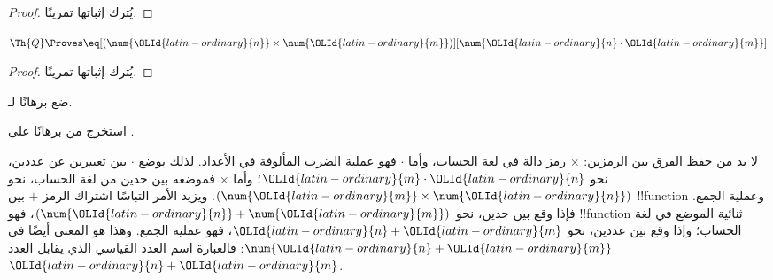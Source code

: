 \documentclass[../../../include/open-logic-section]{subfiles}
\begin{document}
\begin{proof} يُترك إثباتها تمرينًا. \end{proof}

\begin{lem}
$\Th{Q} \Proves \eq[(\num{{\OLId{latin-ordinary}{n}}} \times \num{{\OLId{latin-ordinary}{m}}})][\num{{\OLId{latin-ordinary}{n}} \cdot {\OLId{latin-ordinary}{m}}}]$
\end{lem}

\begin{proof} يُترك إثباتها تمرينًا. \end{proof}

\begin{prob}
ضع برهانًا لـ.
\end{prob}

\begin{prob}
استخرج من  برهانًا على
.
\end{prob}

\begin{explain}
  لا بد من حفظ الفرق بين الرمزين: $\times$ رمز دالة في لغة الحساب،
  وأما $\cdot$ فهو عملية الضرب المألوفة في الأعداد.
  لذلك يوضع $\cdot$ بين تعبيرين عن عددين، نحو ${\OLId{latin-ordinary}{m}}\cdot {\OLId{latin-ordinary}{n}}$؛
  وأما $\times$ فموضعه بين حدين من لغة الحساب، نحو
  $(\num{{\OLId{latin-ordinary}{m}}}\times\num{{\OLId{latin-ordinary}{n}}})$. ويزيد الأمر التباسًا اشتراك الرمز $+$
  بين !!{function} وعملية الجمع. فإذا وقع بين حدين،
  نحو $(\num{{\OLId{latin-ordinary}{n}}}+\num{{\OLId{latin-ordinary}{m}}})$، فهو !!{function} ثنائية الموضع في لغة الحساب؛
  وإذا وقع بين عددين، نحو ${\OLId{latin-ordinary}{n}}+{\OLId{latin-ordinary}{m}}$، فهو عملية الجمع.
  وهذا هو المعنى أيضًا في $\num{{\OLId{latin-ordinary}{n}}+{\OLId{latin-ordinary}{m}}}$: فالعبارة اسم العدد القياسي الذي
  يقابل العدد~${\OLId{latin-ordinary}{n}}+{\OLId{latin-ordinary}{m}}$.
\end{explain}
\end{document}
